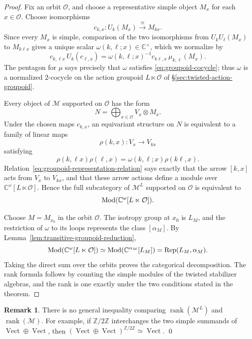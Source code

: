\documentclass{amsart}
\theoremstyle{definition}
\newtheorem{remark}[theorem]{Remark}
\newcommand{\Rep}{\operatorname{Rep}}
\newcommand{\Vect}{\operatorname{Vect}}
\newcommand{\rank}{\operatorname{rank}}
\newcommand{\M}{\mathscr{M}}
\newcommand{\Ctimes}{\mathbb{C}^{\times}}
\numberwithin{equation}{section}
\begin{document}
\begin{proof}
Fix an orbit $\mathcal O$, and choose a representative simple object $M_x$ for
each $x\in\mathcal O$.  Choose isomorphisms
\[
 c_{k,x}:U_k(M_x)\xrightarrow{\cong}M_{kx}.
\]
Since every $M_x$ is simple, comparison of the two isomorphisms from
$U_kU_\ell(M_x)$ to $M_{k\ell x}$ gives a unique scalar
$\omega(k,\ell;x)\in\Ctimes$, which we normalize by
\begin{equation}\label{eq:groupoid-cocycle-from-equivariance}
 c_{k,\ell x}\,U_k(c_{\ell,x})
 =\omega(k,\ell;x)^{-1}
   c_{k\ell,x}\,\mu_{k,\ell}(M_x).
\end{equation}
The pentagon for $\mu$ says precisely that $\omega$ satisfies
\eqref{eq:groupoid-cocycle}; thus $\omega$ is a normalized $2$-cocycle on the
action groupoid $L\ltimes\mathcal O$ of
\S\ref{sec:twisted-action-groupoid}.

Every object of $\M$ supported on $\mathcal O$ has the form
\[
 N=\bigoplus_{x\in\mathcal O}V_x\otimes M_x.
\]
Under the chosen maps $c_{k,x}$, an equivariant structure on $N$ is equivalent
to a family of linear maps
\[
 \rho(k,x):V_x\longrightarrow V_{kx}
\]
satisfying
\begin{equation}\label{eq:groupoid-representation-relation}
 \rho(k,\ell x)\rho(\ell,x)
 =\omega(k,\ell;x)\rho(k\ell,x).
\end{equation}
Relation~\eqref{eq:groupoid-representation-relation} says exactly that the arrow
$[k,x]$ acts from $V_x$ to $V_{kx}$, and that these arrow actions define a module
over $\mathbb C^{\omega}[L\ltimes\mathcal O]$.  Hence the full subcategory of
$\M^L$ supported on $\mathcal O$ is equivalent to
\[
 {\rm Mod}(\mathbb C^{\omega}[L\ltimes\mathcal O]).
\]

Choose $M=M_{x_0}$ in the orbit $\mathcal O$.  The isotropy group at $x_0$ is $L_M$, and the
restriction of $\omega$ to its loops represents the class $[\alpha_M]$.  By
Lemma~\ref{lem:transitive-groupoid-reduction},
\[
 {\rm Mod}(\mathbb C^{\omega}[L\ltimes\mathcal O])
 \simeq
 {\rm Mod}(\mathbb C^{\alpha_M}[L_M])
 =\Rep(L_M,\alpha_M).
\]
Taking the direct sum over the orbits proves the categorical decomposition.  The
rank formula follows by counting the simple modules of the twisted stabilizer
algebras, and the rank is one exactly under the two conditions stated in the
theorem.
\end{proof}

\begin{remark}\label{rem:no-rank-inequality}
There is no general inequality comparing $\rank(\M^L)$ and $\rank(\M)$.  For
example, if $\mathbb{Z}/2\mathbb{Z}$ interchanges the two simple summands of $\Vect\oplus\Vect$, then
$(\Vect\oplus\Vect)^{\mathbb{Z}/2\mathbb{Z}}\simeq\Vect$. \qed
\end{remark}
\end{document}

